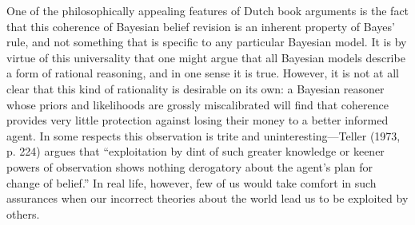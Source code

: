 \documentclass[doc,floatsintext]{apa6}
\begin{document}
One of the philosophically appealing features of Dutch book arguments is the fact that this coherence of Bayesian belief revision is an inherent property of Bayes' rule, and not something that is specific to any particular Bayesian model. It is by virtue of this universality that one might argue that all Bayesian models describe a form of rational reasoning, and in one sense it is true. However, it is not at all clear that this kind of rationality is desirable on its own: a Bayesian reasoner whose priors and likelihoods are grossly miscalibrated will find that coherence provides very little protection against losing their money to a better informed agent. In some respects this observation is trite and uninteresting---Teller (1973, p. 224) argues that ``exploitation by dint of such greater knowledge or keener powers of observation shows nothing derogatory about the agent's plan for change of belief.'' In real life, however, few of us would take comfort in such assurances when our incorrect theories about the world lead us to be exploited by others.
\end{document}
